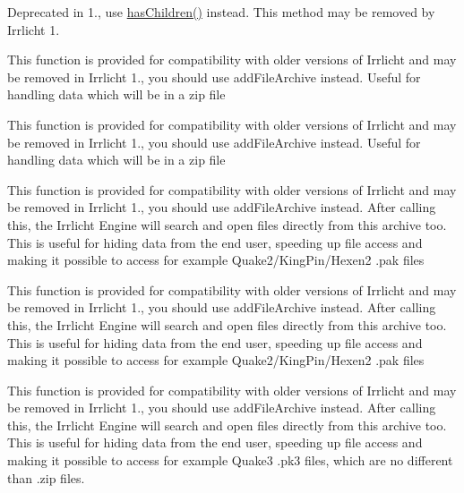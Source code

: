 \begin{DoxyRefList}
Deprecated in 1., use \hyperlink{classirr_1_1gui_1_1IGUITreeViewNode_a64244b92443fefbd06c910daf5db3c5f}{has\+Children()} instead. This method may be removed by Irrlicht 1.  
\item[\label{deprecated__deprecated000003}%
\Hypertarget{deprecated__deprecated000003}%
Member \hyperlink{classirr_1_1io_1_1IFileSystem_a7b5235a1473ff67d97f1487211762723}{irr\+:\+:io\+:\+:I\+File\+System\+:\+:add\+Folder\+File\+Archive} (const c8 $\ast$filename, bool ignore\+Case=true, bool ignore\+Paths=true)]This function is provided for compatibility with older versions of Irrlicht and may be removed in Irrlicht 1., you should use add\+File\+Archive instead. Useful for handling data which will be in a zip file 

This function is provided for compatibility with older versions of Irrlicht and may be removed in Irrlicht 1., you should use add\+File\+Archive instead. Useful for handling data which will be in a zip file  
\item[\label{deprecated__deprecated000004}%
\Hypertarget{deprecated__deprecated000004}%
Member \hyperlink{classirr_1_1io_1_1IFileSystem_a5ade21d59a80b16965d57d1977ad6cc4}{irr\+:\+:io\+:\+:I\+File\+System\+:\+:add\+Pak\+File\+Archive} (const c8 $\ast$filename, bool ignore\+Case=true, bool ignore\+Paths=true)]This function is provided for compatibility with older versions of Irrlicht and may be removed in Irrlicht 1., you should use add\+File\+Archive instead. After calling this, the Irrlicht Engine will search and open files directly from this archive too. This is useful for hiding data from the end user, speeding up file access and making it possible to access for example Quake2/\+King\+Pin/\+Hexen2 .pak files 

This function is provided for compatibility with older versions of Irrlicht and may be removed in Irrlicht 1., you should use add\+File\+Archive instead. After calling this, the Irrlicht Engine will search and open files directly from this archive too. This is useful for hiding data from the end user, speeding up file access and making it possible to access for example Quake2/\+King\+Pin/\+Hexen2 .pak files  
\item[\label{deprecated__deprecated000002}%
\Hypertarget{deprecated__deprecated000002}%
Member \hyperlink{classirr_1_1io_1_1IFileSystem_aef11ff9b5c171d7b3a99d8a79b71f2b3}{irr\+:\+:io\+:\+:I\+File\+System\+:\+:add\+Zip\+File\+Archive} (const c8 $\ast$filename, bool ignore\+Case=true, bool ignore\+Paths=true)]This function is provided for compatibility with older versions of Irrlicht and may be removed in Irrlicht 1., you should use add\+File\+Archive instead. After calling this, the Irrlicht Engine will search and open files directly from this archive too. This is useful for hiding data from the end user, speeding up file access and making it possible to access for example Quake3 .pk3 files, which are no different than .zip files. 


\end{DoxyRefList}
